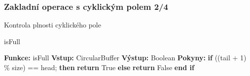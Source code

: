\documentclass[]{fitthesispresn}
\begin{document}
    \begin{frame}
        \frametitle{Zakladní operace s cyklickým polem 2/4}
        Kontrola plnosti cyklického pole
        \begin{algorithm}[H]
        \caption{isFull}
        \label{alg:isfull}
        \begin{algorithmic}[1]
            \State \textbf{Funkce:} isFull
            \State \textbf{Vstup:} CircularBuffer
            \State \textbf{Výstup:} Boolean
            \State \textbf{Pokyny:}
            \State \hspace{\algorithmicindent} \textbf{if} ((tail + 1) \% size) == head; \textbf{then}
            \State \hspace{\algorithmicindent} \hspace{\algorithmicindent} \textbf{return} True
            \State \hspace{\algorithmicindent} \textbf{else}
            \State \hspace{\algorithmicindent} \hspace{\algorithmicindent} \textbf{return} False
            \State \hspace{\algorithmicindent} \textbf{end if}
        \end{algorithmic}
        \end{algorithm}
    \end{frame}
\end{document}
